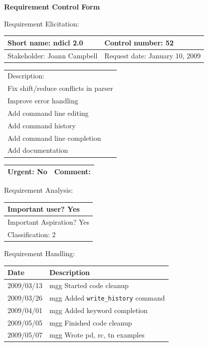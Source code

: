 \begin{center}\Large\bf
Requirement Control Form
\end{center}
\vspace{24pt}

Requirement Elicitation:

\begin{tabular}{|p{211pt}|p{211pt}|} \hline
Short name: ndicl 2.0 & Control number: 52\\ \hline
Stakeholder: Joann Campbell & Request date: January 10, 2009\\
\end{tabular}
\begin{tabular}{|p{433pt}|} \hline
Description: \\ 
Fix shift/reduce conflicts in parser\\
Improve error handling\\
Add command line editing\\
Add command history\\
Add command line completion\\
Add documentation\\
\hline
\end{tabular} 
\begin{tabular}{|p{211pt}|p{211pt}|} \hline
Urgent: No & Comment: \\ \hline
\end{tabular}

\vspace{24pt}

Requirement Analysis:

\begin{tabular}{|p{433pt}|} \hline
Important user? Yes \\ \hline
Important Aspiration? Yes \\ \hline
Classification: 2 \\ \hline
\end{tabular}
\vspace{24pt}

Requirement Handling:

\begin{tabular}{|p{72pt}|p{351pt}|} \hline
Date & Description \\ \hline
2009/03/13 & mgg Started code cleanup \\ \hline
2009/03/26 & mgg Added \texttt{write\_history} command \\ \hline
2009/04/01 & mgg Added keyword completion \\ \hline
2009/05/05 & mgg Finished code cleanup \\ \hline
2009/05/07 & mgg Wrote pd, rc, tn examples \\ \hline
\end{tabular}
